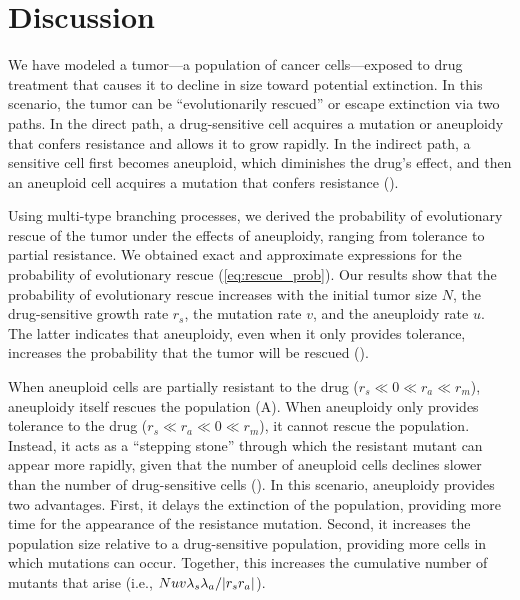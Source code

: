 \documentclass[12pt]{extarticle}
\renewcommand{\Delta}{r}
\begin{document}


\section*{Discussion}

We have modeled a tumor---a population of cancer cells---exposed to drug treatment that causes it to decline in size toward potential extinction.
In this scenario, the tumor can be ``evolutionarily rescued'' or escape extinction via two paths.
In the direct path, a drug-sensitive cell acquires a mutation or aneuploidy that confers resistance and allows it to grow rapidly.
In the indirect path, a sensitive cell first becomes aneuploid, which diminishes the drug's effect, and then an aneuploid cell acquires a mutation that confers resistance (). 

Using multi-type branching processes, we derived the probability of evolutionary rescue of the tumor under the effects of aneuploidy, ranging from tolerance to partial resistance.
We obtained exact and approximate expressions for the probability of evolutionary rescue (\cref{eq:rescue_prob}). 
Our results show that the probability of evolutionary rescue increases with the initial tumor size $N$, the drug-sensitive growth rate $\Delta_s$, the mutation rate $v$, and the aneuploidy rate $u$. The latter indicates that aneuploidy, even when it only provides tolerance, increases the probability that the tumor will be rescued (). 

When aneuploid cells are partially resistant to the drug ($\Delta_s\ll0\ll\Delta_a\ll\Delta_m$), aneuploidy itself rescues the population (A). 
When aneuploidy only provides tolerance to the drug ($\Delta_s\ll\Delta_a\ll0\ll\Delta_m$), it cannot rescue the population.
Instead, it acts as a ``stepping stone'' through which the resistant mutant can appear more rapidly, given that the number of aneuploid cells declines slower than the number of drug-sensitive cells (). 
In this scenario, aneuploidy provides two advantages. First, it delays the extinction of the population, providing more time for the appearance of the resistance mutation. 
Second, it increases the population size relative to a drug-sensitive population, providing more cells in which mutations can occur. 
Together, this increases the cumulative number of mutants that arise (i.e., $N u v \lambda_s \lambda_a / \abs{\Delta_s \Delta_a}$). %
\end{document}
